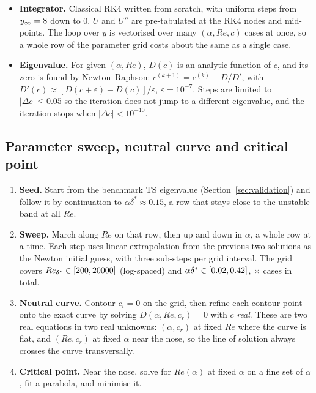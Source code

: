 \documentclass[12pt,a4paper]{article}
\begin{document}
\begin{itemize}
    \item \textbf{Integrator.} Classical RK4 written from scratch, with \osNsteps{} uniform steps from $y_\infty = 8$ down to $0$. $U$ and $U''$ are pre-tabulated at the RK4 nodes and mid-points. The loop over $y$ is vectorised over many $(\alpha, Re, c)$ cases at once, so a whole row of the parameter grid costs about the same as a single case.
    \item \textbf{Eigenvalue.} For given $(\alpha, Re)$, $D(c)$ is an analytic function of $c$, and its zero is found by Newton--Raphson: $c^{(k+1)} = c^{(k)} - D/D'$, with $D'(c) \approx [D(c + \varepsilon) - D(c)]/\varepsilon$, $\varepsilon = 10^{-7}$. Steps are limited to $|\Delta c| \le 0.05$ so the iteration does not jump to a different eigenvalue, and the iteration stops when $|\Delta c| < 10^{-10}$.
\end{itemize}

\subsection{Parameter sweep, neutral curve and critical point}

\begin{enumerate}
    \item \textbf{Seed.} Start from the benchmark TS eigenvalue (Section~\ref{sec:validation}) and follow it by continuation to $\alpha\delta^* \approx 0.15$, a row that stays close to the unstable band at all $Re$.
    \item \textbf{Sweep.} March along $Re$ on that row, then up and down in $\alpha$, a whole row at a time. Each step uses linear extrapolation from the previous two solutions as the Newton initial guess, with three sub-steps per grid interval. The grid covers $Re_{\delta^*} \in [200, 20000]$ (log-spaced) and $\alpha\delta^* \in [0.02, 0.42]$, \osNRe$\times$\osNAlpha{} cases in total.
    \item \textbf{Neutral curve.} Contour $c_i = 0$ on the grid, then refine each contour point onto the exact curve by solving $D(\alpha, Re, c_r) = 0$ with $c$ \emph{real}. These are two real equations in two real unknowns: $(\alpha, c_r)$ at fixed $Re$ where the curve is flat, and $(Re, c_r)$ at fixed $\alpha$ near the nose, so the line of solution always crosses the curve transversally.
    \item \textbf{Critical point.} Near the nose, solve for $Re(\alpha)$ at fixed $\alpha$ on a fine set of $\alpha$, fit a parabola, and minimise it.
\end{enumerate}
\end{document}
